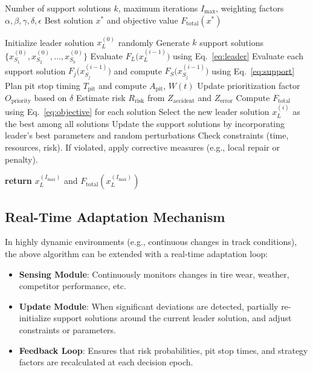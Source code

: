 \documentclass[preprint,12pt]{elsarticle}
\begin{document}
\begin{algorithm}[!ht]
\caption{Formula-Inspired Team-Based Optimization Algorithm}
\label{alg:pitstop}
\begin{algorithmic}[1]
\REQUIRE Number of support solutions $k$, maximum iterations $I_{\max}$, weighting factors $\alpha, \beta, \gamma, \delta, \epsilon$
\ENSURE Best solution $x^{*}$ and objective value $F_{\text{total}}(x^{*})$

\STATE Initialize leader solution $x^{(0)}_{L}$ randomly
\STATE Generate $k$ support solutions $\{ x^{(0)}_{S_1}, x^{(0)}_{S_2}, \dots, x^{(0)}_{S_k} \}$
    \STATE Evaluate $F_L\bigl(x^{(i-1)}_{L}\bigr)$ using Eq.~\eqref{eq:leader}
    \STATE Evaluate each support solution $F_j\bigl(x^{(i-1)}_{S_j}\bigr)$ and compute $F_S\bigl(x^{(i-1)}_{S_j}\bigr)$ using Eq.~\eqref{eq:support}
    \STATE Plan pit stop timing $T_{\text{pit}}$ and compute $A_{\text{pit}}$, $W(t)$
    \STATE Update prioritization factor $O_{\text{priority}}$ based on $\delta$
    \STATE Estimate risk $R_{\text{risk}}$ from $Z_{\text{accident}}$ and $Z_{\text{error}}$
    \STATE Compute $F_{\text{total}}$ using Eq.~\eqref{eq:objective} for each solution
    \STATE Select the new leader solution $x^{(i)}_{L}$ as the best among all solutions
    \STATE Update the support solutions by incorporating leader’s best parameters and random perturbations
    \STATE Check constraints (time, resources, risk). If violated, apply corrective measures (e.g., local repair or penalty).
\ENDFOR

\STATE \textbf{return} $x^{(I_{\max})}_{L}$ and $F_{\text{total}}(x^{(I_{\max})}_{L})$
\end{algorithmic}
\end{algorithm}

\subsection{Real-Time Adaptation Mechanism}

In highly dynamic environments (e.g., continuous changes in track conditions), the above algorithm can be extended with a real-time adaptation loop:
\begin{itemize}
    \item \textbf{Sensing Module}: Continuously monitors changes in tire wear, weather, competitor performance, etc.
    \item \textbf{Update Module}: When significant deviations are detected, partially re-initialize support solutions around the current leader solution, and adjust constraints or parameters.
    \item \textbf{Feedback Loop}: Ensures that risk probabilities, pit stop times, and strategy factors are recalculated at each decision epoch.
\end{itemize}
\end{document}

